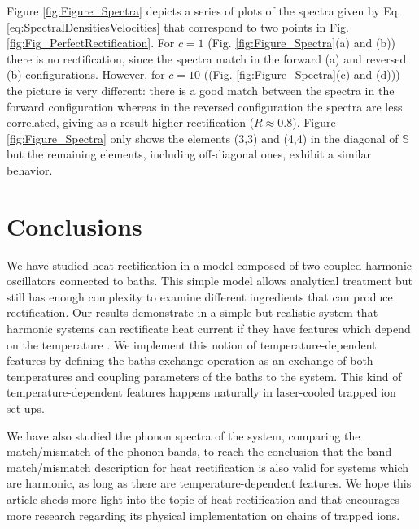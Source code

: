 %
Figure \ref{fig:Figure_Spectra} depicts a series of plots of the spectra given by Eq. \eqref{eq:SpectralDensitiesVelocities} that correspond to two points in Fig. \ref{fig:Fig_PerfectRectification}. For $c=1$ (Fig. \ref{fig:Figure_Spectra}(a) and (b)) there is no rectification, since the spectra match in the forward (a) and reversed (b) configurations. However, for $c=10$ ((Fig. \ref{fig:Figure_Spectra}(c) and (d))) the picture is very different: there is a good match between the spectra in the forward configuration whereas in the reversed configuration the spectra are less correlated, giving as a result higher rectification ($R \approx 0.8$). Figure \ref{fig:Figure_Spectra} only shows the elements (3,3) and (4,4) in the diagonal of $\mathbb{S}$ but the remaining elements, including off-diagonal ones, exhibit a similar behavior.
%
\section{Conclusions \label{sec:Conclusions}}
%
We have studied heat rectification in a model composed of two coupled harmonic oscillators connected to baths. This simple model allows analytical treatment but still has enough complexity to examine different ingredients that can produce rectification. %
Our results demonstrate in a simple but realistic system that harmonic systems can rectificate heat current if they have features which depend on the temperature  \cite{Pereira2017}. We implement this notion of temperature-dependent features by defining the baths exchange operation as an exchange of both temperatures and coupling parameters of the baths to the system. This kind of temperature-dependent features happens naturally in laser-cooled trapped ion set-ups.

We have also studied the phonon spectra of the system, comparing the match/mismatch of the phonon bands, to reach the conclusion that the band match/mismatch description for heat rectification is also valid for systems which are harmonic, as long as there are temperature-dependent features.
We hope this article sheds more light into the topic of heat rectification and that encourages more research regarding its physical implementation on chains of trapped ions.
